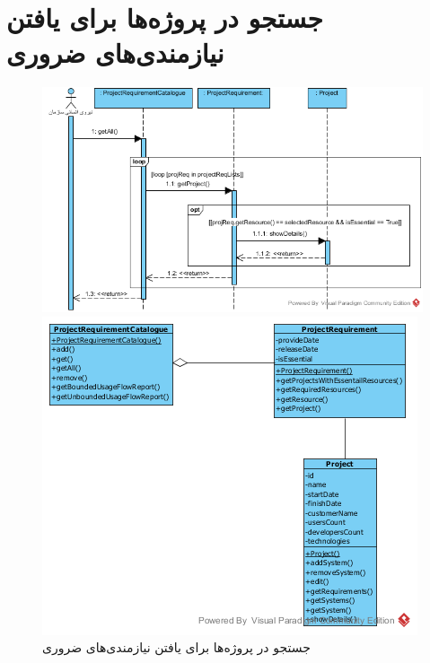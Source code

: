 \section{جستجو در پروژه‌ها برای یافتن نیازمندی‌های ضروری}
\begin{figure}[H]
	\centering
	\includegraphics[scale=0.6]{img/sequence-analysis/SearchForEssentialRequirements}
	
	
	\includegraphics[scale=0.6]{img/sequence-analysis/SearchForEssentialRequirementsC}
	\caption{جستجو در پروژه‌ها برای یافتن نیازمندی‌های ضروری}
\end{figure}


